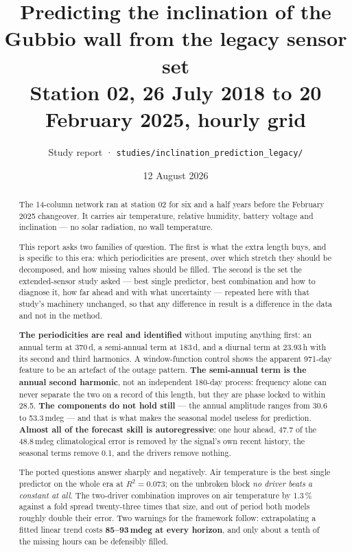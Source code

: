 \documentclass[11pt,a4paper]{article}
\title{\vspace{-1.2cm}\textbf{Predicting the inclination of the Gubbio wall
from the legacy sensor set}\\[2mm]
\large Station 02, 26 July 2018 to 20 February 2025, hourly grid}
\author{Study report · \texttt{studies/inclination\_prediction\_legacy/}}
\date{12 August 2026}
\begin{document}
\maketitle
\thispagestyle{fancy}

\begin{abstract}
\noindent
The 14-column network ran at station 02 for six and a half years before the
February 2025 changeover. It carries air temperature, relative humidity, battery
voltage and inclination --- no solar radiation, no wall temperature.

This report asks two families of question. The first is what the extra length
buys, and is specific to this era: which periodicities are present, over which
stretch they should be decomposed, and how missing values should be filled. The
second is the set the extended-sensor study asked --- best single predictor, best
combination and how to diagnose it, how far ahead and with what uncertainty ---
repeated here with that study's machinery unchanged, so that any difference in
result is a difference in the data and not in the method.

\textbf{The periodicities are real and identified} without imputing anything
first: an annual term at 370\,d, a semi-annual term at 183\,d, and a diurnal term
at 23.93\,h with its second and third harmonics. A window-function control shows
the apparent 971-day feature to be an artefact of the outage pattern.
\textbf{The semi-annual term is the annual second harmonic}, not an independent
180-day process: frequency alone can never separate the two on a record of this
length, but they are phase locked to within 28.5\textdegree.
\textbf{The components do not hold still} --- the annual amplitude ranges from
30.6 to 53.3\,mdeg --- and that is what makes the seasonal model useless for
prediction. \textbf{Almost all of the forecast skill is autoregressive}: one hour
ahead, 47.7 of the 48.8\,mdeg climatological error is removed by the signal's own
recent history, the seasonal terms remove 0.1, and the drivers remove nothing.

The ported questions answer sharply and negatively. Air temperature is the best
single predictor on the whole era at $R^2 = 0.073$; on the unbroken block
\emph{no driver beats a constant at all}. The two-driver combination improves on
air temperature by 1.3\,\% against a fold spread twenty-three times that size,
and out of period both models roughly double their error. Two warnings for the
framework follow: extrapolating a fitted linear trend costs \textbf{85--93\,mdeg
at every horizon}, and only about a tenth of the missing hours can be defensibly
filled.


\end{abstract}
\end{document}
